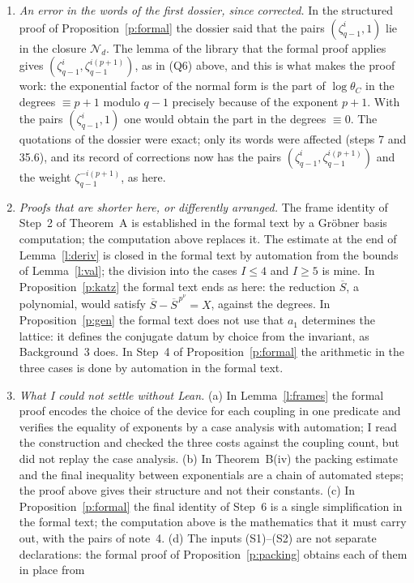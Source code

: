 \documentclass[11pt,a4paper]{article}
\theoremstyle{plainx}
\theoremstyle{uprightx}
\newcommand{\cj}[1]{\overline{#1}}
\newcommand{\thC}[1]{\theta_{#1}}
\begin{document}
\begin{enumerate}[label=\textup{\arabic*.},leftmargin=1.6em,itemsep=5pt]
\item \emph{An error in the words of the first dossier, since corrected.} In the structured proof of
Proposition~\ref{p:formal} the dossier said that the pairs $(\zeta_{q-1}^i,1)$ lie in the closure $\mathcal{N}_d$. The lemma of the library that the
formal proof applies gives $(\zeta_{q-1}^i,\zeta_{q-1}^{i(p+1)})$, as in (Q6) above, and this is what makes the proof work: the
exponential factor of the normal form is the part of $\log\thC{C}$ in the degrees $\equiv p+1$ modulo $q-1$
precisely because of the exponent $p+1$. With the pairs $(\zeta_{q-1}^i,1)$ one would obtain the part in the degrees
$\equiv0$. The quotations of the dossier were exact; only its words were affected (steps 7 and 35.6), and its
record of corrections now has the pairs $(\zeta_{q-1}^i,\zeta_{q-1}^{i(p+1)})$ and the weight $\zeta_{q-1}^{-i(p+1)}$, as here.
\item \emph{Proofs that are shorter here, or differently arranged.} The frame identity of Step~2 of Theorem~A is
established in the formal text by a Gröbner basis computation; the computation above replaces it. The estimate at
the end of Lemma~\ref{l:deriv} is closed in the formal text by automation from the bounds of Lemma~\ref{l:val}; the
division into the cases $I\le4$ and $I\ge5$ is mine. In Proposition~\ref{p:katz} the formal text ends as
here: the reduction $\cj S$, a polynomial, would satisfy $\cj S-\cj S^{\,p^\nu}=X$, against the degrees. In
Proposition~\ref{p:gen} the formal text does not use that $a_1$ determines the lattice: it defines the conjugate
datum by choice from the invariant, as Background~3 does. In Step~4 of Proposition~\ref{p:formal} the
arithmetic in the three cases is done by automation in the formal text.
\item \emph{What I could not settle without Lean.} (a) In Lemma~\ref{l:frames} the formal proof encodes the choice
of the device for each coupling in one predicate and verifies the equality of exponents by a case analysis with
automation; I read the construction and checked the three costs against the coupling count, but did not replay the
case analysis. (b) In Theorem~B(iv) the packing estimate and the final inequality between exponentials are a chain
of automated steps; the proof above gives their structure and not their constants. (c) In
Proposition~\ref{p:formal} the final identity of Step~6 is a single simplification in the formal text; the
computation above is the mathematics that it must carry out, with the pairs of note~4. (d) The inputs (S1)--(S2)
are not separate declarations: the formal proof of Proposition~\ref{p:packing} obtains each of them in place from

\end{enumerate}
\end{document}
